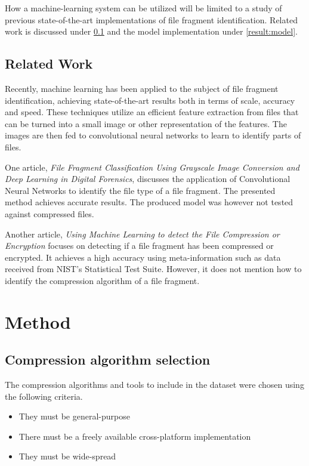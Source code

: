 \documentclass[conference]{IEEEtran}
\begin{document}
How a machine-learning system can be utilized will be limited to a study of previous state-of-the-art implementations of file fragment identification. Related work is discussed under \ref{introduction:related} and the model implementation under \ref{result:model}.

\subsection{Related Work}
\label{introduction:related}
Recently, machine learning has been applied to the subject of file fragment identification, achieving state-of-the-art results both in terms of scale, accuracy and speed. These techniques utilize an efficient feature extraction from files that can be turned into a small image or other representation of the features. The images are then fed to convolutional neural networks to learn to identify parts of files.

One article, \textit{File Fragment Classification Using Grayscale Image Conversion and Deep Learning in Digital Forensics}, discusses the application of Convolutional Neural Networks to identify the file type of a file fragment. The presented method achieves accurate results. The produced model was however not tested against compressed files\cite{chen2018}.

Another article, \textit{Using Machine Learning to detect the File Compression or Encryption} focuses on detecting if a file fragment has been compressed or encrypted. It achieves a high accuracy using meta-information such as data received from NIST's Statistical Test Suite. However, it does not mention how to identify the compression algorithm of a file fragment\cite{hahn2018}.

\section{Method}

\subsection{Compression algorithm selection}

The compression algorithms and tools to include in the dataset were chosen using the following criteria.

\begin{itemize}
    \item They must be general-purpose
    \item There must be a freely available cross-platform implementation
    \item They must be wide-spread
\end{itemize}
\end{document}
